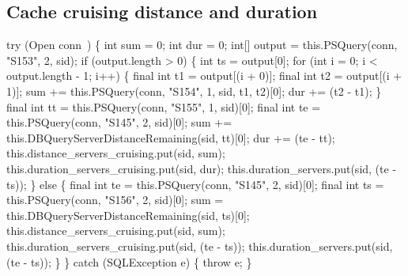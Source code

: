 \subsection{Cache cruising distance and duration}
\nwenddocs{}\endmoddef{}
try (\LA{}Open \code{}conn\edoc{}~{\nwtagstyle{}}\RA{}) \{
  int sum = 0;
  int dur = 0;
  int[] output = this.PSQuery(conn, "S153", 2, sid);
  if (output.length > 0) \{
    int ts = output[0];
    for (int i = 0; i < output.length - 1; i++) \{
      final int t1 = output[(i + 0)];
      final int t2 = output[(i + 1)];
      sum += this.PSQuery(conn, "S154", 1, sid, t1, t2)[0];
      dur += (t2 - t1);
    \}
    final int tt = this.PSQuery(conn, "S155", 1, sid)[0];
    final int te = this.PSQuery(conn, "S145", 2, sid)[0];
    sum += this.DBQueryServerDistanceRemaining(sid, tt)[0];
    dur += (te - tt);
    this.distance_servers_cruising.put(sid, sum);
    this.duration_servers_cruising.put(sid, dur);
    this.duration_servers.put(sid, (te - ts));
  \} else \{
    final int te = this.PSQuery(conn, "S145", 2, sid)[0];
    final int ts = this.PSQuery(conn, "S156", 2, sid)[0];
    sum = this.DBQueryServerDistanceRemaining(sid, ts)[0];
    this.distance_servers_cruising.put(sid, sum);
    this.duration_servers_cruising.put(sid, (te - ts));
    this.duration_servers.put(sid, (te - ts));
  \}
\} catch (SQLException e) \{
  throw e;
\}
\nwendcode{}\nwdocspar

